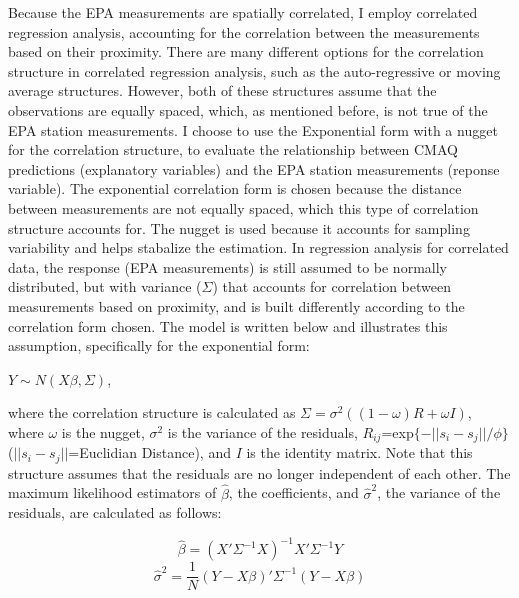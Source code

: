 \documentclass{svproc}
\begin{document}
Because the EPA measurements are spatially correlated, I employ correlated regression analysis, accounting for the correlation between the measurements based on their proximity. There are many different options for the correlation structure in correlated regression analysis, such as the auto-regressive or moving average structures. However, both of these structures assume that the observations are equally spaced, which, as mentioned before, is not true of the EPA station measurements. I choose to use the Exponential form with a nugget for the correlation structure, to evaluate the relationship between CMAQ predictions (explanatory variables) and the EPA station measurements (reponse variable). The exponential correlation form is chosen because the distance between measurements are not equally spaced, which this type of correlation structure accounts for. The nugget is used because it accounts for sampling variability and helps stabalize the estimation. In regression analysis for correlated data, the response (EPA measurements) is still assumed to be normally distributed, but with variance ($\Sigma$) that accounts for correlation between measurements based on proximity, and is built differently according to the correlation form chosen. The model is written below and illustrates this assumption, specifically for the exponential form:

\begin{center}
$Y \sim N(X\beta, \Sigma)$,  
\end{center}

where the correlation structure is calculated as $\Sigma = \sigma^2 ((1-\omega)R+\omega I)$, where $\omega$ is the nugget, $\sigma^2$ is the variance of the residuals, $R_{ij}$=exp$\{-||s_i-s_j||/\phi\}$ ($||s_i-s_j||$=Euclidian Distance), and $I$ is the identity matrix. Note that this structure assumes that the residuals are no longer independent of each other. The maximum likelihood estimators of $\hat{\beta}$, the coefficients, and $\hat{\sigma}^2$, the variance of the residuals, are calculated as follows:

\begin{equation}
\hat{\beta} = (X'\Sigma^{-1}X)^{-1}X'\Sigma^{-1}Y
\end{equation}
\begin{equation}
\hat{\sigma}^2=\frac{1}{N}(Y-X\beta)'\Sigma^{-1}(Y-X\beta)
\end{equation}
\end{document}
